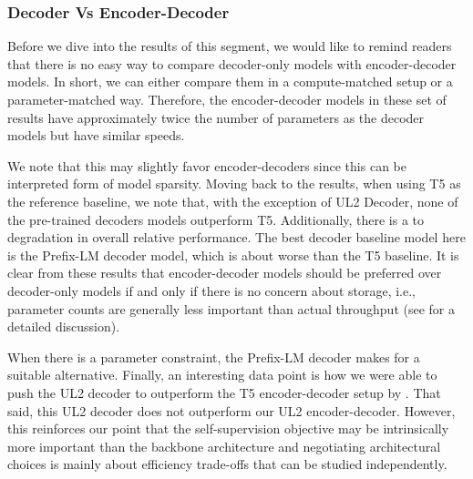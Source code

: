 \documentclass[10pt]{article}
\begin{document}
\subsubsection{Decoder Vs Encoder-Decoder}
Before we dive into the results of this segment, we would like to remind readers that there is no easy way to compare decoder-only models with encoder-decoder models. In short, we can either compare them in a compute-matched setup or a parameter-matched way. Therefore, the encoder-decoder models in these set of results have approximately twice the number of parameters as the decoder models but have similar speeds. 

We note that this may slightly favor encoder-decoders since this can be interpreted form of model sparsity. Moving back to the results, when using T5 as the reference baseline, we note that, with the exception of UL2 Decoder, none of the pre-trained decoders models outperform T5. Additionally, there is a  to  degradation in overall relative performance. The best decoder baseline model here is the Prefix-LM decoder model, which is about  worse than the T5 baseline. It is clear from these results that encoder-decoder models should be preferred over decoder-only models if and only if there is no concern about storage, i.e., parameter counts are generally less important than actual throughput (see \citep{dehghani2021efficiency} for a detailed discussion). 

When there is a parameter constraint, the Prefix-LM decoder makes for a suitable alternative. Finally, an interesting data point is how we were able to push the UL2 decoder to outperform the T5 encoder-decoder setup by . That said, this UL2 decoder does not outperform our UL2 encoder-decoder. However, this reinforces our point that the self-supervision objective may be intrinsically more important than the backbone architecture and negotiating architectural choices is mainly about efficiency trade-offs that can be studied independently.
\end{document}
